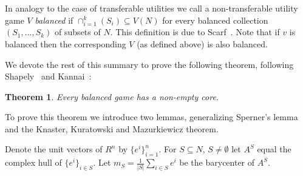 \documentclass[11pt]{article} \usepackage{amssymb}
\newtheorem{theorem}{Theorem}[section]
\begin{document}
In analogy to the case of transferable utilities we call a
non-transferable utility game $V$ {\em balanced} if $\cap_{i=1}^k(S_i)
\subseteq V(N)$ for every balanced collection $(S_1,\ldots,S_k)$ of
subsets of $N$. This definition is due to
Scarf~\cite{scarf:1967}. Note that if $v$ is balanced then the
corresponding $V$ (as defined above) is also balanced.

We devote the rest of this summary to prove the following theorem,
following Shapely~\cite{shapley:1973} and Kannai~\cite{kannai:1970}:

\begin{theorem}
  Every balanced game has a non-empty core.
\end{theorem}

To prove this theorem we introduce two lemmas, generalizing Sperner's
lemma and the Knaster, Kuratowski and Mazurkiewicz theorem.

Denote the unit vectors of $R^n$ by $\{e^i\}_{i=1}^n$. For $S
\subseteq N$, $S \neq \emptyset$ let $A^S$ equal the complex hull of
$\{e^i\}_{i \in S}$. Let $m_S = \frac{1}{|S|}\sum_{i \in S}e^i$ be the
barycenter of $A^S$. 
 


 
\end{document}

